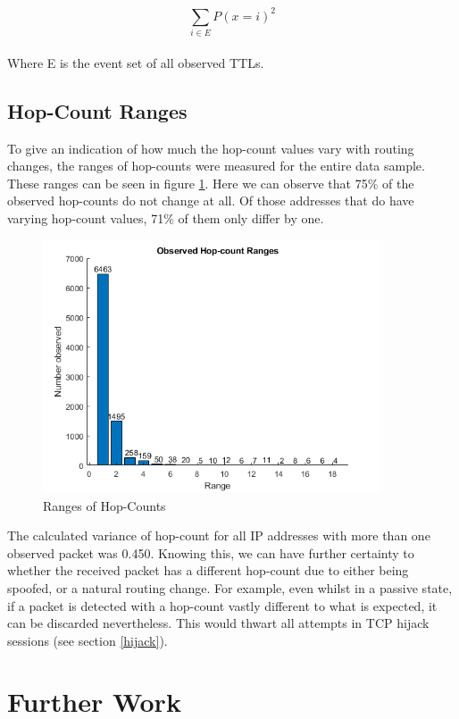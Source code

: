 \documentclass[12pt,twoside]{article}
\begin{document}
\begin{equation}
	\sum_{i\in E}^{}P(x = i)^2
\end{equation}\\
Where E is the event set of all observed TTLs.

\subsection{Hop-Count Ranges}
To give an indication of how much the hop-count values vary with routing changes, the ranges of hop-counts were measured for the entire data sample. These ranges can be seen in figure \ref{ranges}. Here we can observe that 75\% of the observed hop-counts do not change at all. Of those addresses that do have varying hop-count values, 71\% of them only differ by one. 

\begin{figure}[h]
	\begin{center}
		\includegraphics[width=10cm]{figures/hop_count_ranges}
	\end{center}
	\caption{Ranges of Hop-Counts}
	\label{ranges} 
\end{figure}
The calculated variance of hop-count for all IP addresses with more than one observed packet was 0.450. Knowing this, we can have further certainty to whether the received packet has a different hop-count due to either being spoofed, or a natural routing change. For example, even whilst in a passive state, if a packet is detected with a hop-count vastly different to what is expected, it can be discarded nevertheless. This would thwart all attempts in TCP hijack sessions (see section \ref{hijack}).

\section{Further Work}\label{future}
\end{document}
